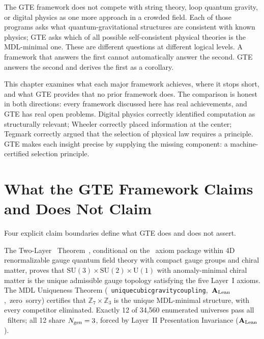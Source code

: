 \documentclass[11pt,openany]{book}
\theoremstyle{remark}
\newcommand{\PSC}{\text{PSC}}
\newcommand{\ZS}{\mathbb{Z}_7}
\newcommand{\lean}[1]{%
  \penalty-100
  \begingroup\def\_{\textunderscore\allowbreak}\texttt{#1}\endgroup}
\newcommand{\Ngen}{N_{\rm gen}}
\newcommand{\CatAL}{\ensuremath{\textbf{A}_{\rm Lean}}}
\newcommand{\CatAD}{\textbf{A/D}}
\begin{document}
The GTE framework does not compete with string theory, loop quantum gravity, or digital
physics as one more approach in a crowded field. Each of those programs asks what
quantum-gravitational structures are consistent with known physics; GTE asks which of all
possible self-consistent physical theories is the MDL-minimal one. These are different
questions at different logical levels. A framework that answers the first cannot
automatically answer the second. GTE answers the second and derives the first as a
corollary.

This chapter examines what each major framework achieves, where it stops short, and what
GTE provides that no prior framework does. The comparison is honest in both directions:
every framework discussed here has real achievements, and GTE has real open problems.
Digital physics correctly identified computation as structurally relevant; Wheeler correctly
placed information at the center; Tegmark correctly argued that the selection of physical
law requires a principle. GTE makes each insight precise by supplying the missing
component: a machine-certified selection principle.

\section{What the GTE Framework Claims and Does Not Claim}
\label{sec:claims_boundary}

Four explicit claim boundaries define what GTE does and does not assert.

\begin{tcolorbox}[colback=orange!5,colframe=orange!60,
  title={Claim~A: SM Gauge Structure and Generation Count (\CatAD/\CatAL)}]
The Two-Layer \PSC\ Theorem~\cite{SpivackNEMS05}, conditional on the \PSC\ axiom
package within 4D renormalizable gauge quantum field theory with compact gauge groups
and chiral matter, proves that $\mathrm{SU}(3)\times\mathrm{SU}(2)\times\mathrm{U}(1)$
with anomaly-minimal chiral matter is the unique admissible gauge topology satisfying
the five Layer~I axioms.
The MDL Uniqueness Theorem \mbox{(\lean{unique\_cubic\_gravity\_coupling}, \CatAL, zero sorry)} certifies
that $\ZS\times\mathbb{Z}_3$ is the unique MDL-minimal structure, with every competitor
eliminated.  Exactly 12 of 34,560 enumerated universes pass all \PSC\ filters;
all 12 share $\Ngen = 3$, forced by Layer~II Presentation Invariance (\CatAL).
\end{tcolorbox}
\end{document}
